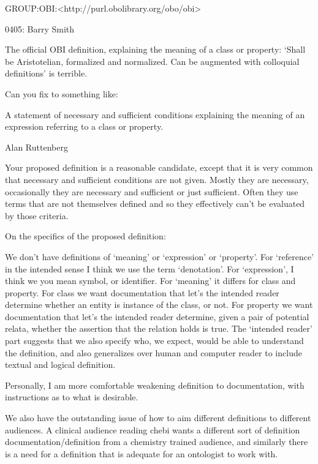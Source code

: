 \documentclass[letterpaper,10pt,english]{sphinxmanual}
\begin{document}
\begin{sphinxShadowBox}

\sphinxAtStartPar
GROUP:OBI:\textless{}http://purl.obolibrary.org/obo/obi\textgreater{}
\end{sphinxShadowBox}

\begin{sphinxShadowBox}

\sphinxhyphen{}04\sphinxhyphen{}05:
Barry Smith

\sphinxAtStartPar
The official OBI definition, explaining the meaning of a class or property: ‘Shall be Aristotelian, formalized and normalized. Can be augmented with colloquial definitions’  is terrible.

\sphinxAtStartPar
Can you fix to something like:

\sphinxAtStartPar
A statement of necessary and sufficient conditions explaining the meaning of an expression referring to a class or property.

\sphinxAtStartPar
Alan Ruttenberg

\sphinxAtStartPar
Your proposed definition is a reasonable candidate, except that it is very common that necessary and sufficient conditions are not given. Mostly they are necessary, occasionally they are necessary and sufficient or just sufficient. Often they use terms that are not themselves defined and so they effectively can’t be evaluated by those criteria.

\sphinxAtStartPar
On the specifics of the proposed definition:

\sphinxAtStartPar
We don’t have definitions of ‘meaning’ or ‘expression’ or ‘property’. For ‘reference’ in the intended sense I think we use the term ‘denotation’. For ‘expression’, I think we you mean symbol, or identifier. For ‘meaning’ it differs for class and property. For class we want documentation that let’s the intended reader determine whether an entity is instance of the class, or not. For property we want documentation that let’s the intended reader determine, given a pair of potential relata, whether the assertion that the relation holds is true. The ‘intended reader’ part suggests that we also specify who, we expect, would be able to understand the definition, and also generalizes over human and computer reader to include textual and logical definition.

\sphinxAtStartPar
Personally, I am more comfortable weakening definition to documentation, with instructions as to what is desirable.

\sphinxAtStartPar
We also have the outstanding issue of how to aim different definitions to different audiences. A clinical audience reading chebi wants a different sort of definition documentation/definition from a chemistry trained audience, and similarly there is a need for a definition that is adequate for an ontologist to work with.
\end{sphinxShadowBox}
\end{document}
